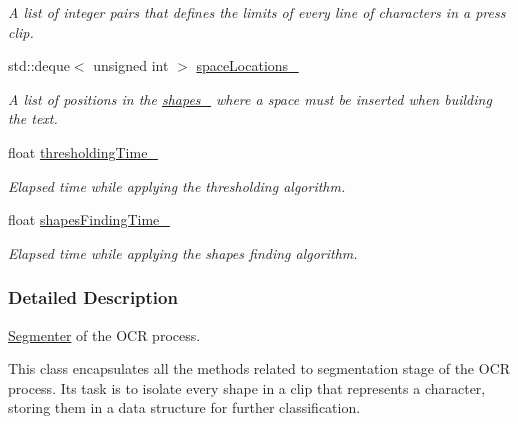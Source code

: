 \begin{CompactItemize}
\begin{CompactList}\small\item\em A list of integer pairs that defines the limits of every line of characters in a press clip. \item\end{CompactList}\item 
\hypertarget{class_segmenter_b6a330577017efe9e49c174c04c4f7c3}{
std::deque$<$ unsigned int $>$ \hyperlink{class_segmenter_b6a330577017efe9e49c174c04c4f7c3}{spaceLocations\_\-}}
\label{class_segmenter_b6a330577017efe9e49c174c04c4f7c3}

\begin{CompactList}\small\item\em A list of positions in the \hyperlink{class_segmenter_41b94ede2829063e0937dc150756e77e}{shapes\_\-} where a space must be inserted when building the text. \item\end{CompactList}\item 
\hypertarget{class_segmenter_1b02328044551876a7b878fc1549bc70}{
float \hyperlink{class_segmenter_1b02328044551876a7b878fc1549bc70}{thresholdingTime\_\-}}
\label{class_segmenter_1b02328044551876a7b878fc1549bc70}

\begin{CompactList}\small\item\em Elapsed time while applying the thresholding algorithm. \item\end{CompactList}\item 
\hypertarget{class_segmenter_e0ade77ddbdc2f6c5eaa1efe372c5a7b}{
float \hyperlink{class_segmenter_e0ade77ddbdc2f6c5eaa1efe372c5a7b}{shapesFindingTime\_\-}}
\label{class_segmenter_e0ade77ddbdc2f6c5eaa1efe372c5a7b}

\begin{CompactList}\small\item\em Elapsed time while applying the shapes finding algorithm. \item\end{CompactList}\end{CompactItemize}


\subsubsection{Detailed Description}
\hyperlink{class_segmenter}{Segmenter} of the OCR process. 

This class encapsulates all the methods related to segmentation stage of the OCR process. Its task is to isolate every shape in a clip that represents a character, storing them in a data structure for further classification.

